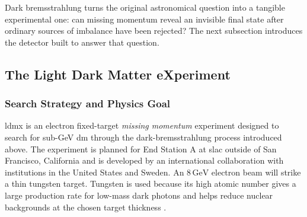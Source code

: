 Dark bremsstrahlung turns the original astronomical question into a tangible
experimental one: can missing momentum reveal an invisible final state after
ordinary sources of imbalance have been rejected? The next subsection
introduces the detector built to answer that question.





\subsection{The Light Dark Matter eXperiment}
\label{sec:ldmx}

\subsubsection{Search Strategy and Physics Goal}




\Gls{ldmx} is an electron fixed-target \textit{missing momentum} experiment
designed to search for sub-GeV \gls{dm} through the dark-bremsstrahlung
process introduced above. The experiment is planned for End Station A at
\gls{slac} outside of San Francisco, California and is developed by an international collaboration
with institutions in the United States and Sweden. An \(8\,\mathrm{GeV}\)
electron beam will strike a thin tungsten target. Tungsten is used because
its high atomic number gives a large production rate for low-mass dark
photons and helps reduce nuclear backgrounds at the chosen target thickness
\cite{ldmx2025-overview}.






